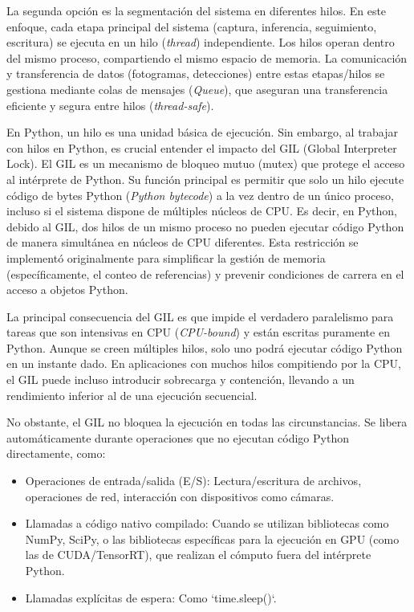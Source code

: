 \documentclass[11pt,spanish,listoffigures,listoftables]{tfgetsinf}
\begin{document}
La segunda opción es la segmentación del sistema en diferentes hilos. En este enfoque, cada etapa principal del sistema (captura, inferencia, seguimiento, escritura) se ejecuta en un hilo (\textit{thread}) independiente. Los hilos operan dentro del mismo proceso, compartiendo el mismo espacio de memoria. La comunicación y transferencia de datos (fotogramas, detecciones) entre estas etapas/hilos se gestiona mediante colas de mensajes (\textit{Queue}), que aseguran una transferencia eficiente y segura entre hilos (\textit{thread-safe}).

En Python, un hilo es una unidad básica de ejecución. Sin embargo, al trabajar con hilos en Python, es crucial entender el impacto del GIL (Global Interpreter Lock). El GIL es un mecanismo de bloqueo mutuo (mutex) que protege el acceso al intérprete de Python. Su función principal es permitir que solo un hilo ejecute código de bytes Python (\textit{Python bytecode}) a la vez dentro de un único proceso, incluso si el sistema dispone de múltiples núcleos de CPU. Es decir, en Python, debido al GIL, dos hilos de un mismo proceso no pueden ejecutar código Python de manera simultánea en núcleos de CPU diferentes. Esta restricción se implementó originalmente para simplificar la gestión de memoria (específicamente, el conteo de referencias) y prevenir condiciones de carrera en el acceso a objetos Python.

La principal consecuencia del GIL es que impide el verdadero paralelismo para tareas que son intensivas en CPU (\textit{CPU-bound}) y están escritas puramente en Python. Aunque se creen múltiples hilos, solo uno podrá ejecutar código Python en un instante dado. En aplicaciones con muchos hilos compitiendo por la CPU, el GIL puede incluso introducir sobrecarga y contención, llevando a un rendimiento inferior al de una ejecución secuencial.

No obstante, el GIL no bloquea la ejecución en todas las circunstancias. Se libera automáticamente durante operaciones que no ejecutan código Python directamente, como:
\begin{itemize}
   \item Operaciones de entrada/salida (E/S): Lectura/escritura de archivos, operaciones de red, interacción con dispositivos como cámaras.
   \item Llamadas a código nativo compilado: Cuando se utilizan bibliotecas como NumPy, SciPy, o las bibliotecas específicas para la ejecución en GPU (como las de CUDA/TensorRT), que realizan el cómputo fuera del intérprete Python.
   \item Llamadas explícitas de espera: Como `time.sleep()`.
\end{itemize}
\end{document}
